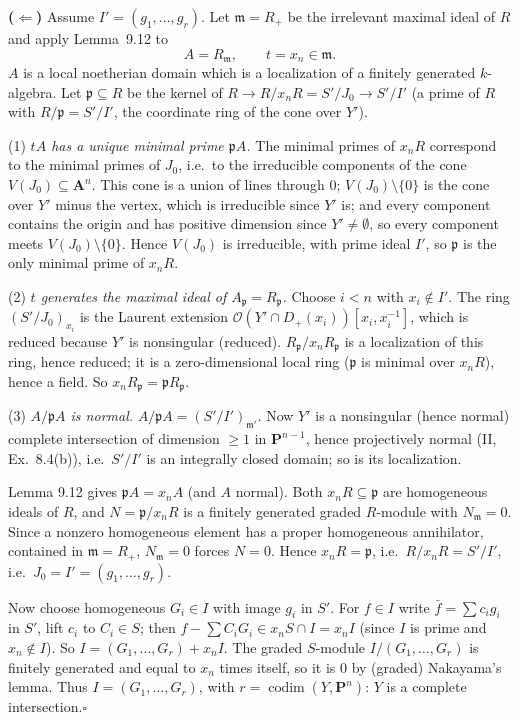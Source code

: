 \documentclass[11pt]{article}
\begin{document}
\textbf{($\Leftarrow$)} Assume $I'=(g_1,\dots,g_r)$. Let $\mathfrak m=R_+$ be the irrelevant maximal ideal of $R$ and apply Lemma~9.12 to
\[
A=R_{\mathfrak m},\qquad t=x_n\in\mathfrak m .
\]
$A$ is a local noetherian domain which is a localization of a finitely generated $k$-algebra. Let $\mathfrak p\subseteq R$ be the kernel of $R\to R/x_nR=S'/J_0\to S'/I'$ (a prime of $R$ with $R/\mathfrak p=S'/I'$, the coordinate ring of the cone over $Y'$).

(1) \emph{$tA$ has a unique minimal prime $\mathfrak pA$.} The minimal primes of $x_nR$ correspond to the minimal primes of $J_0$, i.e.\ to the irreducible components of the cone $V(J_0)\subseteq\mathbf A^n$. This cone is a union of lines through $0$; $V(J_0)\setminus\{0\}$ is the cone over $Y'$ minus the vertex, which is irreducible since $Y'$ is; and every component contains the origin and has positive dimension since $Y'\ne\emptyset$, so every component meets $V(J_0)\setminus\{0\}$. Hence $V(J_0)$ is irreducible, with prime ideal $I'$, so $\mathfrak p$ is the only minimal prime of $x_nR$.

(2) \emph{$t$ generates the maximal ideal of $A_{\mathfrak p}=R_{\mathfrak p}$.} Choose $i<n$ with $x_i\notin I'$. The ring $(S'/J_0)_{x_i}$ is the Laurent extension $\mathcal O(Y'\cap D_+(x_i))[x_i,x_i^{-1}]$, which is reduced because $Y'$ is nonsingular (reduced). $R_{\mathfrak p}/x_nR_{\mathfrak p}$ is a localization of this ring, hence reduced; it is a zero-dimensional local ring ($\mathfrak p$ is minimal over $x_nR$), hence a field. So $x_nR_{\mathfrak p}=\mathfrak pR_{\mathfrak p}$.

(3) \emph{$A/\mathfrak pA$ is normal.} $A/\mathfrak pA=(S'/I')_{\mathfrak m'}$. Now $Y'$ is a nonsingular (hence normal) complete intersection of dimension $\ge1$ in $\mathbf P^{n-1}$, hence projectively normal (II, Ex.~8.4(b)), i.e.\ $S'/I'$ is an integrally closed domain; so is its localization.

Lemma 9.12 gives $\mathfrak pA=x_nA$ (and $A$ normal). Both $x_nR\subseteq\mathfrak p$ are homogeneous ideals of $R$, and $N=\mathfrak p/x_nR$ is a finitely generated graded $R$-module with $N_{\mathfrak m}=0$. Since a nonzero homogeneous element has a proper homogeneous annihilator, contained in $\mathfrak m=R_+$, $N_{\mathfrak m}=0$ forces $N=0$. Hence $x_nR=\mathfrak p$, i.e.\ $R/x_nR=S'/I'$, i.e.\ $J_0=I'=(g_1,\dots,g_r)$.

Now choose homogeneous $G_i\in I$ with image $g_i$ in $S'$. For $f\in I$ write $\bar f=\sum c_ig_i$ in $S'$, lift $c_i$ to $C_i\in S$; then $f-\sum C_iG_i\in x_nS\cap I=x_nI$ (since $I$ is prime and $x_n\notin I$). So $I=(G_1,\dots,G_r)+x_nI$. The graded $S$-module $I/(G_1,\dots,G_r)$ is finitely generated and equal to $x_n$ times itself, so it is $0$ by (graded) Nakayama's lemma. Thus $I=(G_1,\dots,G_r)$, with $r=\operatorname{codim}(Y,\mathbf P^n)$: $Y$ is a complete intersection.\hfill$\square$
\end{document}

